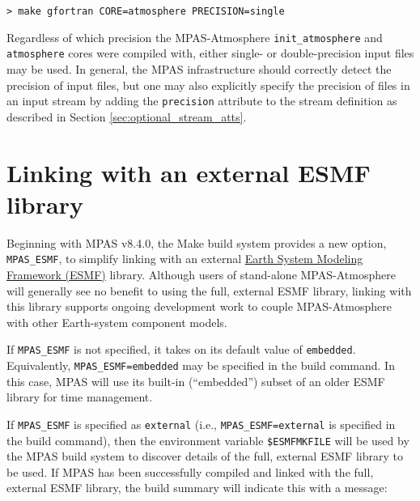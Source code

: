 {\vspace{12pt}
{\tt > make gfortran CORE=atmosphere PRECISION=single}
\vspace{12pt}

Regardless of which precision the MPAS-Atmosphere {\tt init\_atmosphere} and {\tt atmosphere} cores were compiled
with, either single- or double-precision input files may be used. In general, the MPAS infrastructure should
correctly detect the precision of input files, but one may also explicitly specify the precision of files in
an input stream by adding the {\tt precision} attribute to the stream definition as described in Section \ref{sec:optional_stream_atts}.

\section{Linking with an external ESMF library}
\label{sec:build_esmf}

Beginning with MPAS v8.4.0, the Make build system provides a new option, {\tt MPAS\_ESMF}, to simplify linking with an external \href{https://earthsystemmodeling.org/}{Earth System Modeling Framework (ESMF)} library.
Although users of stand-alone MPAS-Atmosphere will generally see no benefit to using the full, external ESMF library, linking with this library supports ongoing development work to couple MPAS-Atmosphere with other Earth-system component models.

If {\tt MPAS\_ESMF} is not specified, it takes on its default value of {\tt embedded}. Equivalently, {\tt MPAS\_ESMF=embedded} may be specified in the build command. In this case, MPAS will use its built-in (``embedded'') subset of an older ESMF library for time management.

If {\tt MPAS\_ESMF} is specified as {\tt external} (i.e., {\tt MPAS\_ESMF=external} is specified in the build command), then the environment variable {\tt \$ESMFMKFILE} will be used by the MPAS build system to discover details of the full, external ESMF library to be used.
If MPAS has been successfully compiled and linked with the full, external ESMF library, the build summary will indicate this with a message:

}

